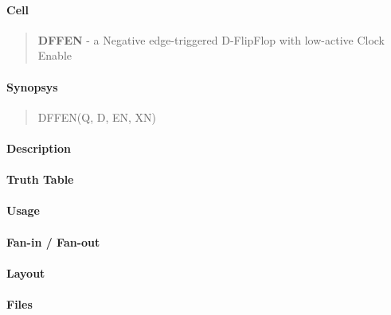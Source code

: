 \label{DFFEN}
\paragraph{Cell}
\begin{quote}
    \textbf{DFFEN} - a Negative edge-triggered D-FlipFlop with low-active Clock Enable
\end{quote}

\paragraph{Synopsys}
\begin{quote}
    DFFEN(Q, D, EN, XN)
\end{quote}

\paragraph{Description}

%

\paragraph{Truth Table}
%

\paragraph{Usage}

\paragraph{Fan-in / Fan-out}

\paragraph{Layout}

\paragraph{Files}
